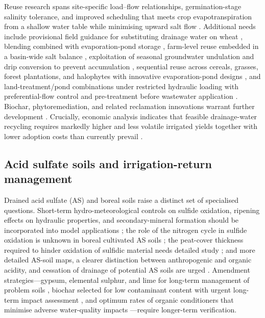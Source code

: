 Reuse research spans site-specific load--flow relationships, germination-stage
salinity tolerance, and improved scheduling that meets crop evapotranspiration
from a shallow water table while minimising upward salt flow
\parencite{WESTCOT1988}. Additional needs include provisional field guidance for
substituting drainage water on wheat \parencite{Sharma1998}, blending combined
with evaporation-pond storage \parencite{Datta2002}, farm-level reuse embedded in
a basin-wide salt balance \parencite{Qureshi2008}, exploitation of seasonal
groundwater undulation and drip conversion to prevent accumulation
\parencite{Mirlas2021,Dou2022,Singh2019}, sequential reuse across cereals,
grasses, forest plantations, and halophytes with innovative evaporation-pond
designs \parencite{Sharma2004}, and land-treatment/pond combinations under
restricted hydraulic loading with preferential-flow control and pre-treatment
before wastewater application \parencite{Christen2010,Duan2015}. Biochar,
phytoremediation, and related reclamation innovations warrant further
development \parencite{Liu2025f,Steppuhn2017,Youngs2000}. Crucially, economic
analysis indicates that feasible drainage-water recycling requires markedly
higher and less volatile irrigated yields together with lower adoption costs
than currently prevail \parencite{Sellars2022}.

\subsection{Acid sulfate soils and irrigation-return management}

Drained acid sulfate (AS) and boreal soils raise a distinct set of specialised
questions. Short-term hydro-meteorological controls on sulfide oxidation,
ripening effects on hydraulic properties, and secondary-mineral formation should
be incorporated into model applications \parencite{Salo2023}; the role of the
nitrogen cycle in sulfide oxidation is unknown in boreal cultivated AS soils
\parencite{Virtanen2017}; the peat-cover thickness required to hinder oxidation
of sulfidic material needs detailed study \parencite{YliHalla2022}; and more
detailed AS-soil maps, a clearer distinction between anthropogenic and organic
acidity, and cessation of drainage of potential AS soils are urged
\parencite{Åström2005}. Amendment strategies---gypsum, elemental sulphur, and
lime for long-term management of problem soils \parencite{MANN1982,He2015},
biochar selected for low contaminant content with urgent long-term impact
assessment \parencite{Tian2023b}, and optimum rates of organic conditioners that
minimise adverse water-quality impacts \parencite{Zhang2015}---require
longer-term verification.

